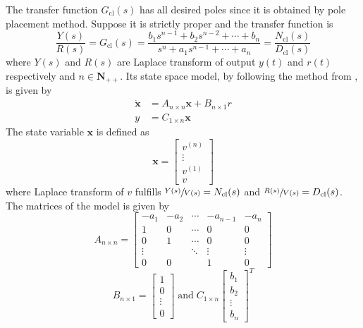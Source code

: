 The transfer function $G_{\text{cl}}(s)$ has all desired poles since it is  obtained by pole placement method. Suppose it is strictly proper and the transfer function is 
$$\frac{Y(s)}{R(s)}=G_{\text{cl}}(s)=\frac{b_1s^{n-1}+b_2s^{n-2}+ \cdots +b_n}{s^n+a_1s^{n-1}+ \cdots + a_n}=\frac{N_\text{cl}(s)}{D_{\text{cl}}(s)}$$ where $Y(s)$ and $R(s)$ are Laplace transform of output $y(t)$ and $r(t)$ respectively and $n \in \mathbf{N_{++}}$. Its state space model, by following the method from \cite{astrom2010feedback}, is given by 
\begin{equation}\label{eq:st_sp}
\begin{aligned} 
\dot{\mathbf{x}}&=A_{n \times n}\mathbf{x}+B_{n \times 1}r\\
y&=C_{1 \times n} \mathbf{x}
\end{aligned} 
\end{equation}
The state variable $\mathbf{x}$ is defined as $$\mathbf{x}=\left[\begin{array}{c}v^{(n)}\\ \vdots \\v^{(1)}\\v \end{array}\right]$$ where Laplace transform of $v$ fulfills $\sfrac{Y(s)}{V(s)}=N_{\text{cl}}(s)$ and $\sfrac{R(s)}{V(s)}=D_{\text{cl}}(s)$. The matrices of the model is given by $$ A_{n \times n} = 
 \left[\begin{array}{ccccc}
  -a_1 & -a_2 & \cdots & -a_{n-1} & -a_n \\
  1 &	0 & \cdots & 0 & 0 \\
  0 &	1 & \cdots & 0 & 0 \\
  \vdots  &   & \ddots & \vdots& \vdots  \\
  0 & 0 &  & 1 & 0
 \end{array}\right] $$ $$ B_{n \times 1} = \left[\begin{array}{c}1\\0\\ \vdots \\ 0 \end{array}\right]\; \text{and}\; C_{1 \times n} \left[\begin{array}{c}b_1\\b_2\\ \vdots \\ b_n \end{array}\right]^T $$